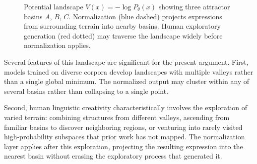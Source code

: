 \documentclass[12pt,a4paper]{article}
\theoremstyle{definition}
\theoremstyle{plain}
\theoremstyle{remark}
\newcommand{\calL}{\mathcal{L}}
\begin{document}
\begin{figure}[h]
\centering
{}
\caption{Potential landscape $V(x) = -\log P_\theta(x)$ showing three attractor basins $A$,
$B$, $C$. Normalization (blue dashed) projects expressions from surrounding terrain into
nearby basins. Human exploratory generation (red dotted) may traverse the landscape widely
before normalization applies.}
\label{fig:landscape}
\end{figure}

Several features of this landscape are significant for the present argument. First, models
trained on diverse corpora develop landscapes with multiple valleys rather than a single global
minimum. The normalized output may cluster within any of several basins rather than
collapsing to a single point.

Second, human linguistic creativity characteristically involves the exploration of varied
terrain: combining structures from different valleys, ascending from familiar basins to
discover neighboring regions, or venturing into rarely visited high-probability subspaces that
prior work has not mapped. The normalization layer applies after this exploration, projecting
the resulting expression into the nearest basin without erasing the exploratory process that
generated it.
\end{document}
